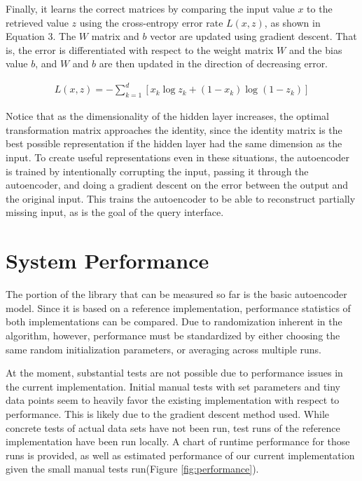 \documentclass{sig-alternate}
\begin{document}
Finally, it learns the correct matrices by comparing the input value $x$ to the retrieved value $z$ 
using the cross-entropy error rate $L(x,z)$, as shown in Equation 3. The $W$ matrix and $b$ vector
are updated using gradient descent. That is, the error is differentiated
with respect to the weight matrix $W$ and the bias value $b$, and $W$ and $b$ are then updated in the
direction of decreasing error. 

\begin{gather}
L(x,z) = -\sum_{k=1}^d [x_k \log z_k + (1-x_k) \log( 1-z_k)]
\end{gather}

Notice that as the dimensionality
of the hidden layer increases, the optimal transformation matrix approaches the identity, since
the identity matrix is the best possible representation if the hidden layer had the same dimension
as the input. To create useful representations even in these situations, the autoencoder is trained
by intentionally corrupting the input, passing it through the autoencoder, and doing a gradient
descent on the error between the output and the original input. This trains the autoencoder
to be able to reconstruct partially missing input, as is the goal of the query interface.

\section{System Performance}
\label{sec:sysperformance}

The portion of the library that can be measured so far is the basic autoencoder model. 
Since it is based on a reference implementation, performance statistics of both
implementations can be compared. Due to randomization inherent in the algorithm, however, 
performance must be standardized by either choosing the same random initialization parameters, or 
averaging across multiple runs. 

At the moment, substantial tests are not possible due to performance issues in the current 
implementation. Initial manual tests with set parameters and tiny data points seem to heavily favor 
the existing implementation with respect to performance. This is likely due to the gradient descent
method used. While concrete tests of actual data sets have not 
been run, test runs of the reference implementation have been run locally. A chart of runtime
performance for those runs is provided, as well as estimated performance of our current 
implementation given the small manual tests run(Figure \ref{fig:performance}). 
\end{document}

